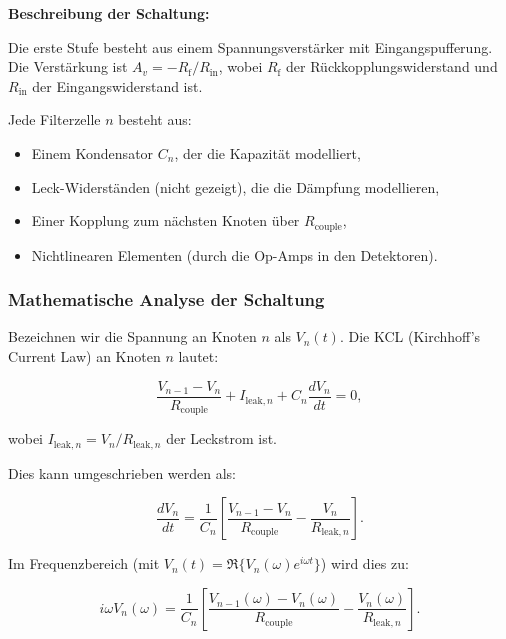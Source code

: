 ﻿\documentclass[12pt, a4paper]{article}
\theoremstyle{definition}
\theoremstyle{remark}
\begin{document}
\textbf{Beschreibung der Schaltung:}

Die erste Stufe besteht aus einem Spannungsverstärker mit Eingangspufferung. 
Die Verstärkung ist $A_v = -R_{\mathrm{f}}/R_{\mathrm{in}}$, wobei 
$R_{\mathrm{f}}$ der Rückkopplungswiderstand und $R_{\mathrm{in}}$ der 
Eingangswiderstand ist.

Jede Filterzelle $n$ besteht aus:
\begin{itemize}
\item Einem Kondensator $C_n$, der die Kapazität modelliert,
\item Leck-Widerständen (nicht gezeigt), die die Dämpfung modellieren,
\item Einer Kopplung zum nächsten Knoten über $R_{\mathrm{couple}}$,
\item Nichtlinearen Elementen (durch die Op-Amps in den Detektoren).
\end{itemize}

\subsubsection{Mathematische Analyse der Schaltung}

Bezeichnen wir die Spannung an Knoten $n$ als $V_n(t)$. Die KCL (Kirchhoff's 
Current Law) an Knoten $n$ lautet:

\begin{equation}
\label{eq:kcl_node_n}
\frac{V_{n-1} - V_n}{R_{\mathrm{couple}}} + I_{\mathrm{leak},n} 
+ C_n \frac{dV_n}{dt} = 0,
\end{equation}

wobei $I_{\mathrm{leak},n} = V_n / R_{\mathrm{leak},n}$ der Leckstrom ist.

Dies kann umgeschrieben werden als:

\begin{equation}
\label{eq:nodal_ode}
\frac{dV_n}{dt} = \frac{1}{C_n} \left[ \frac{V_{n-1} - V_n}{R_{\mathrm{couple}}} 
- \frac{V_n}{R_{\mathrm{leak},n}} \right].
\end{equation}

Im Frequenzbereich (mit $V_n(t) = \Re\{V_n(\omega) e^{i\omega t}\}$) wird dies 
zu:

\begin{equation}
\label{eq:node_frequency_domain}
i\omega V_n(\omega) = \frac{1}{C_n} \left[ \frac{V_{n-1}(\omega) - V_n(\omega)}{R_{\mathrm{couple}}} 
- \frac{V_n(\omega)}{R_{\mathrm{leak},n}} \right].
\end{equation}
\end{document}
